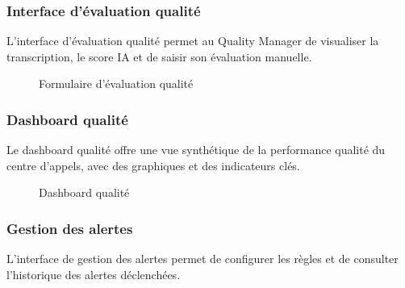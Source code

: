 \subsubsection{Interface d'évaluation qualité}

L'interface d'évaluation qualité permet au Quality Manager de visualiser la transcription,
le score IA et de saisir son évaluation manuelle.

\begin{figure}[H]
    \centering
    \caption{Formulaire d'évaluation qualité}
    \label{fig:sprint4_evaluation_form}
\end{figure}

\subsubsection{Dashboard qualité}

Le dashboard qualité offre une vue synthétique de la performance qualité du centre d'appels,
avec des graphiques et des indicateurs clés.

\begin{figure}[H]
    \centering
    \caption{Dashboard qualité}
    \label{fig:sprint4_quality_dashboard}
\end{figure}

\subsubsection{Gestion des alertes}

L'interface de gestion des alertes permet de configurer les règles et de consulter
l'historique des alertes déclenchées.

